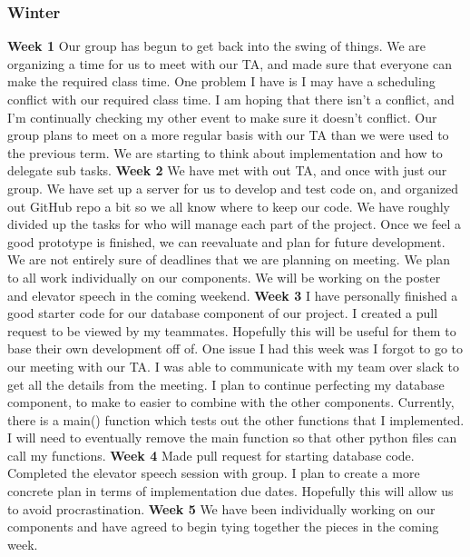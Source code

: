 \documentclass[onecolumn, draftclsnofoot, 10pt, compsoc]{IEEEtran}
\begin{document}
\subsubsection{Winter}
\textbf{Week 1}
Our group has begun to get back into the swing of things. We are organizing a time for us to meet with our TA, and made sure that everyone can make the required class time.
One problem I have is I may have a scheduling conflict with our required class time. I am hoping that there isn't a conflict, and I'm continually checking my other event to make sure it doesn't conflict. 
Our group plans to meet on a more regular basis with our TA than we were used to the previous term. We are starting to think about implementation and how to delegate sub tasks. 
\newline
\textbf{Week 2}
We have met with out TA, and once with just our group. We have set up a server for us to develop and test code on, and organized out GitHub repo a bit so we all know where to keep our code. We have roughly divided up the tasks for who will manage each part of the project. Once we feel a good prototype is finished, we can reevaluate and plan for future development. 
 We are not entirely sure of deadlines that we are planning on meeting.  
We plan to all work individually on our components. We will be working on the poster and elevator speech in the coming weekend. 
\newline
\textbf{Week 3}
I have personally finished a good starter code for our database component of our project. I created a pull request to be viewed by my teammates. Hopefully this will be useful for them to base their own development off of.
One issue I had this week was I forgot to go to our meeting with our TA. I was able to communicate with my team over slack to get all the details from the meeting. 
I plan to continue perfecting my database component, to make to easier to combine with the other components. Currently, there is a main() function which tests out the other functions that I implemented. I will need to eventually remove the main function so that other python files can call my functions.
\newline
\textbf{Week 4}
Made pull request for starting database code. Completed the elevator speech session with group. 
I plan to create a more concrete plan in terms of implementation due dates. Hopefully this will allow us to avoid procrastination. 
\newline
\textbf{Week 5}
We have been individually working on our components and have agreed to begin tying together the pieces in the coming week. 
\end{document}
